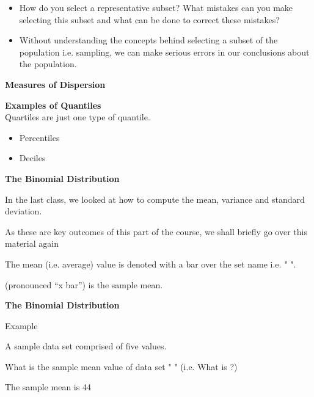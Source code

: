 \documentclass[]{report}
\begin{document}
\begin{itemize}
\item 
How do you select a representative subset? What mistakes can you make selecting this subset and what can be done to correct these mistakes? 
\item Without understanding the concepts behind selecting a subset of the population i.e. sampling, we can make serious errors in our conclusions about the population.  
\end{itemize}







\textbf{Measures of Dispersion}

\textbf{Examples of Quantiles}\\
Quartiles are just one type of quantile.
\begin{itemize}
\item Percentiles
\item Deciles
\end{itemize}






\textbf{The Binomial Distribution}



In the last class, we looked at how to compute the mean, variance and standard deviation. 

As these are key outcomes of this part of the course, we shall briefly go over this material again 

The mean (i.e. average) value is denoted with a bar over the set name i.e. " ".


(pronounced “x bar”)  is the sample mean.




\textbf{The Binomial Distribution}


Example

A sample data set   comprised of five values.          



What is the sample mean value of data set " " (i.e. What is   ?)



The sample mean is 44

\end{document}
